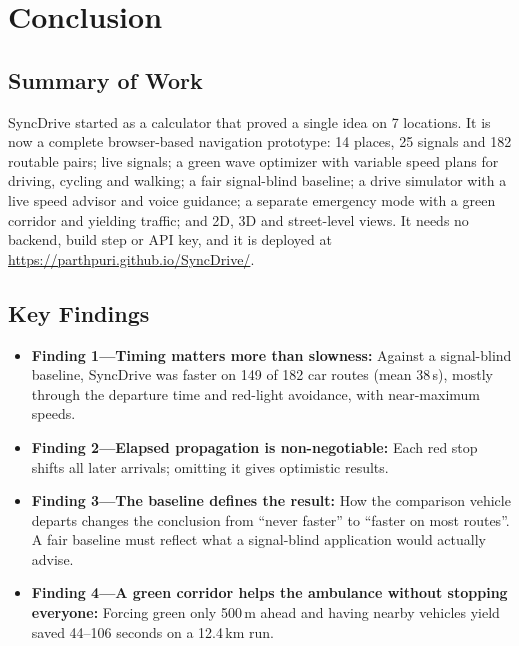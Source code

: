 \documentclass[12pt,a4paper]{report}
\begin{document}
\chapter{Conclusion}

\section{Summary of Work}

SyncDrive started as a calculator that proved a single idea on 7 locations. It
is now a complete browser-based navigation prototype: 14 places, 25 signals and
182 routable pairs; live signals; a green wave optimizer with variable speed
plans for driving, cycling and walking; a fair signal-blind baseline; a drive
simulator with a live speed advisor and voice guidance; a separate emergency
mode with a green corridor and yielding traffic; and 2D, 3D and street-level
views. It needs no backend, build step or API key, and it is deployed at
\url{https://parthpuri.github.io/SyncDrive/}.

\section{Key Findings}

\begin{itemize}
  \item \textbf{Finding 1---Timing matters more than slowness:} Against a
        signal-blind baseline, SyncDrive was faster on 149 of 182 car routes
        (mean 38\,s), mostly through the departure time and red-light
        avoidance, with near-maximum speeds.
  \item \textbf{Finding 2---Elapsed propagation is non-negotiable:} Each red
        stop shifts all later arrivals; omitting it gives optimistic results.
  \item \textbf{Finding 3---The baseline defines the result:} How the
        comparison vehicle departs changes the conclusion from ``never
        faster'' to ``faster on most routes''. A fair baseline must reflect
        what a signal-blind application would actually advise.
  \item \textbf{Finding 4---A green corridor helps the ambulance without
        stopping everyone:} Forcing green only 500\,m ahead and having nearby
        vehicles yield saved 44--106 seconds on a 12.4\,km run.
\end{itemize}
\end{document}
